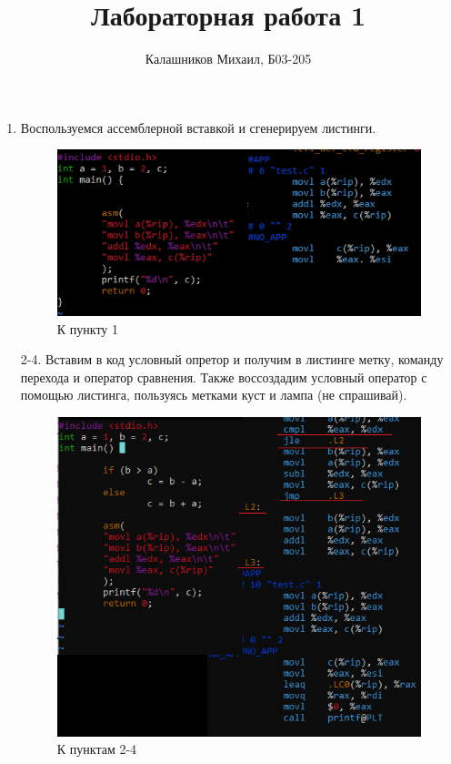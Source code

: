 \documentclass[a4paper,12pt]{article}
\title{Лабораторная работа 1}
\author{Калашников Михаил, Б03-205}
\date{}
\begin{document}

\begin{enumerate}

\setcounter{enumi}{0}

\item Воспользуемся ассемблерной вставкой и сгенерируем листинги.

\begin{figure}[h!]
  \centering
  \includegraphics[width=0.8\linewidth]{images/asm1_1.png}
  \caption{К пункту 1}
\end{figure}

\item[2-4.] Вставим в код условный опретор и получим в листинге метку, команду перехода и оператор сравнения. Также воссоздадим условный оператор с помощью листинга, пользуясь метками куст и лампа (не спрашивай).
\begin{figure}[h!]
  \centering
  \includegraphics[width=0.6\linewidth]{images/asm1_2.png}
  \caption{К пунктам 2-4}
\end{figure}


\end{enumerate}
\end{document}

